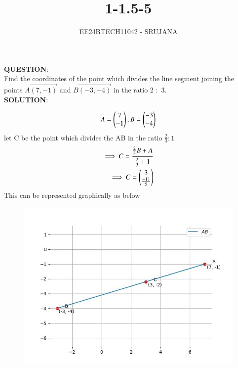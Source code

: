 \documentclass[journal]{IEEEtran}
\begin{document}

\vspace{3cm}

\title{1-1.5-5}
\author{EE24BTECH11042 - SRUJANA}
{\let\newpage\relax\maketitle}

\renewcommand{\thefigure}{\theenumi}
\renewcommand{\thetable}{\theenumi}
\setlength{\intextsep}{10pt} %


\renewcommand{\thetable}{\theenumi}


\textbf{QUESTION}:\\
Find the coordinates of the point which divides the line segment joining the points  $A\vec{(7,-1)}$  and $B\vec{(-3,-4)}$ in the ratio 2 $:$ 3.\\
\textbf{SOLUTION}:\\
\begin{table}[h!]
	\centering
	
	\label{tab1-1.5-5}
\end{table}
\begin{align}
	A=\begin{pmatrix}7\\-1\end{pmatrix} , B=\begin{pmatrix}-3\\-4\end{pmatrix}
\end{align}
let C be the point which divides the AB in the ratio $\frac{2}{3} : 1$
\begin{align}
	\implies C=\frac{\frac{2}{3}B+A}{\frac{2}{3}+1}\\
	\implies C=\begin{pmatrix}3\\\frac{-11}{5}\\\end{pmatrix}
\end{align}
This can be represented graphically as below
\begin{figure}[h!]
   \centering
   \includegraphics[width=0.7\linewidth]{figs/fig.jpg}
\end{figure}
\end{document}

